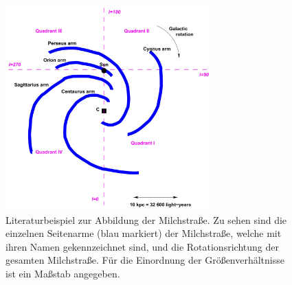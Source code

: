 \begin{figure}[H]
    \centering
    \includegraphics[width= 0.7\textwidth]{pngplots/milchstrasselit.png}   
    \caption[Literaturbeispiel zur Abbildung der Milchstraße]{Literaturbeispiel zur Abbildung der Milchstraße. 
    Zu sehen sind die einzelnen Seitenarme (blau markiert) der Milchstraße, welche mit ihren Namen gekennzeichnet sind, und die Rotationsrichtung der gesamten Milchstraße. 
    Für die Einordnung der Größenverhältnisse ist ein Maßstab angegeben. \cite{H1}}
    \label{fig:Milchstrasselit}
\end{figure}